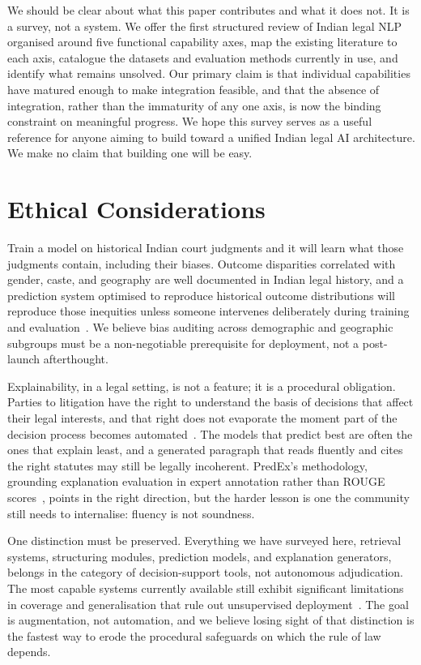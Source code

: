 We should be clear about what this paper contributes and what it does not. It is a survey, not a system. We offer the first structured review of Indian legal NLP organised around five functional capability axes, map the existing literature to each axis, catalogue the datasets and evaluation methods currently in use, and identify what remains unsolved. Our primary claim is that individual capabilities have matured enough to make integration feasible, and that the absence of integration, rather than the immaturity of any one axis, is now the binding constraint on meaningful progress. We hope this survey serves as a useful reference for anyone aiming to build toward a unified Indian legal AI architecture. We make no claim that building one will be easy.

\section{Ethical Considerations}

Train a model on historical Indian court judgments and it will learn what those judgments contain, including their biases. Outcome disparities correlated with gender, caste, and geography are well documented in Indian legal history, and a prediction system optimised to reproduce historical outcome distributions will reproduce those inequities unless someone intervenes deliberately during training and evaluation~\cite{medvedeva-etal-2020-echr}. We believe bias auditing across demographic and geographic subgroups must be a non-negotiable prerequisite for deployment, not a post-launch afterthought.

Explainability, in a legal setting, is not a feature; it is a procedural obligation. Parties to litigation have the right to understand the basis of decisions that affect their legal interests, and that right does not evaporate the moment part of the decision process becomes automated~\cite{deakin-etal-2023-xai-law}. The models that predict best are often the ones that explain least, and a generated paragraph that reads fluently and cites the right statutes may still be legally incoherent. PredEx's methodology, grounding explanation evaluation in expert annotation rather than ROUGE scores~\cite{nigam-etal-2024-predex}, points in the right direction, but the harder lesson is one the community still needs to internalise: fluency is not soundness.

One distinction must be preserved. Everything we have surveyed here, retrieval systems, structuring modules, prediction models, and explanation generators, belongs in the category of decision-support tools, not autonomous adjudication. The most capable systems currently available still exhibit significant limitations in coverage and generalisation that rule out unsupervised deployment~\cite{nigam-etal-2025-nyayaanumana, mersha-etal-2024-xai}. The goal is augmentation, not automation, and we believe losing sight of that distinction is the fastest way to erode the procedural safeguards on which the rule of law depends.
